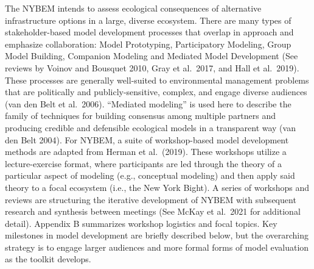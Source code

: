\documentclass[
]{book}
\begin{document}
The NYBEM intends to assess ecological consequences of alternative infrastructure options in a large, diverse ecosystem. There are many types of stakeholder-based model development processes that overlap in approach and emphasize collaboration: Model Prototyping, Participatory Modeling, Group Model Building, Companion Modeling and Mediated Model Development (See reviews by Voinov and Bousquet 2010, Gray et al.~2017, and Hall et al.~2019). These processes are generally well-suited to environmental management problems that are politically and publicly-sensitive, complex, and engage diverse audiences (van den Belt et al.~2006). ``Mediated modeling'' is used here to describe the family of techniques for building consensus among multiple partners and producing credible and defensible ecological models in a transparent way (van den Belt 2004).
For NYBEM, a suite of workshop-based model development methods are adapted from Herman et al.~(2019). These workshops utilize a lecture-exercise format, where participants are led through the theory of a particular aspect of modeling (e.g., conceptual modeling) and then apply said theory to a focal ecosystem (i.e., the New York Bight). A series of workshops and reviews are structuring the iterative development of NYBEM with subsequent research and synthesis between meetings (See McKay et al.~2021 for additional detail). Appendix B summarizes workshop logistics and focal topics. Key milestones in model development are briefly described below, but the overarching strategy is to engage larger audiences and more formal forms of model evaluation as the toolkit develops.
\end{document}
